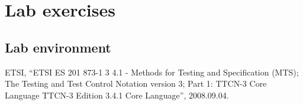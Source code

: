 \documentclass[a4paper]{article}
\begin{document}

\section{Lab exercises}

\subsection{Lab environment}

\begin{thebibliography}{9}

ETSI,
``{ETSI} {ES} 201 873-1 3 4.1 - Methods for Testing and Specification ({MTS}); The
Testing and Test Control Notation version 3; Part 1: {TTCN-3} Core Language {TTCN-3}
Edition 3.4.1 Core Language'', 
2008.09.04.
\end{thebibliography}
\end{document}
